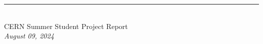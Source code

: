 \begin{titlepage}
\begin{center}
        \large
        \rule{0.7\linewidth}{0.5pt} \\
        CERN Summer Student Project Report \\
        \textit{August 09, 2024}
        \vspace{0.2cm}
        
            
    \end{center}
\end{titlepage}